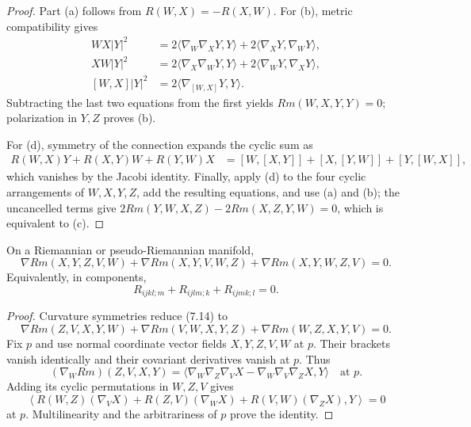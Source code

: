 \begin{proof}
\sketch Part (a) follows from $R(W,X)=-R(X,W)$. For (b), metric
compatibility gives
\begin{align*}
WX|Y|^2&=2\langle\nabla_W\nabla_XY,Y\rangle
 +2\langle\nabla_XY,\nabla_WY\rangle,\\
XW|Y|^2&=2\langle\nabla_X\nabla_WY,Y\rangle
 +2\langle\nabla_WY,\nabla_XY\rangle,\\
[W,X]|Y|^2&=2\langle\nabla_{[W,X]}Y,Y\rangle.
\end{align*}
Subtracting the last two equations from the first yields
$Rm(W,X,Y,Y)=0$; polarization in $Y,Z$ proves (b).

For (d), symmetry of the connection expands the cyclic sum as
\begin{align*}
R(W,X)Y+R(X,Y)W+R(Y,W)X
&=[W,[X,Y]]+[X,[Y,W]]+[Y,[W,X]],
\end{align*}
which vanishes by the Jacobi identity. Finally, apply (d) to the four cyclic
arrangements of $W,X,Y,Z$, add the resulting equations, and use (a) and (b);
the uncancelled terms give
$2Rm(Y,W,X,Z)-2Rm(X,Z,Y,W)=0$, which is equivalent to (c).
\end{proof}

\begin{proposition}
\label{prop:differential-bianchi-identity}

On a Riemannian or pseudo-Riemannian manifold,
\begin{equation}
\nabla Rm(X,Y,Z,V,W)+\nabla Rm(X,Y,V,W,Z)
+\nabla Rm(X,Y,W,Z,V)=0.
\tag{7.14}
\end{equation}
Equivalently, in components,
\begin{equation}
R_{ijkl;m}+R_{ijlm;k}+R_{ijmk;l}=0.
\tag{7.15}
\end{equation}
\end{proposition}

\begin{proof}
\sketch Curvature symmetries reduce (7.14) to
\begin{equation}
\nabla Rm(Z,V,X,Y,W)+\nabla Rm(V,W,X,Y,Z)
+\nabla Rm(W,Z,X,Y,V)=0.
\tag{7.16}
\end{equation}
Fix $p$ and use normal coordinate vector fields $X,Y,Z,V,W$ at $p$. Their
brackets vanish identically and their covariant derivatives vanish at $p$.
Thus
\[
(\nabla_WRm)(Z,V,X,Y)
=\langle\nabla_W\nabla_Z\nabla_VX-\nabla_W\nabla_V\nabla_ZX,Y\rangle
\quad\text{at }p.
\]
Adding its cyclic permutations in $W,Z,V$ gives
\[
\left\langle
R(W,Z)(\nabla_VX)+R(Z,V)(\nabla_WX)+R(V,W)(\nabla_ZX),Y
\right\rangle=0
\]
at $p$. Multilinearity and the arbitrariness of $p$ prove the identity.
\end{proof}

